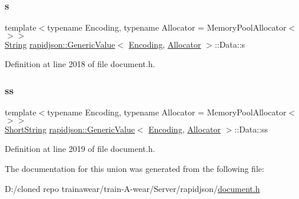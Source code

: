 \mbox{\label{unionrapidjson_1_1_generic_value_1_1_data_aeb486daed8565779613fefe9a92b5e73}} 
\subsubsection{\texorpdfstring{s}{s}}
{\footnotesize\ttfamily template$<$typename Encoding, typename Allocator = Memory\+Pool\+Allocator$<$$>$$>$ \\
\mbox{\hyperlink{structrapidjson_1_1_generic_value_1_1_string}{String}} \mbox{\hyperlink{classrapidjson_1_1_generic_value}{rapidjson\+::\+Generic\+Value}}$<$ \mbox{\hyperlink{classrapidjson_1_1_encoding}{Encoding}}, \mbox{\hyperlink{classrapidjson_1_1_allocator}{Allocator}} $>$\+::Data\+::s}



Definition at line 2018 of file document.\+h.

\mbox{\label{unionrapidjson_1_1_generic_value_1_1_data_a9d91531b96cea2f7e459ceab1d6fb55e}} 
\subsubsection{\texorpdfstring{ss}{ss}}
{\footnotesize\ttfamily template$<$typename Encoding, typename Allocator = Memory\+Pool\+Allocator$<$$>$$>$ \\
\mbox{\hyperlink{structrapidjson_1_1_generic_value_1_1_short_string}{Short\+String}} \mbox{\hyperlink{classrapidjson_1_1_generic_value}{rapidjson\+::\+Generic\+Value}}$<$ \mbox{\hyperlink{classrapidjson_1_1_encoding}{Encoding}}, \mbox{\hyperlink{classrapidjson_1_1_allocator}{Allocator}} $>$\+::Data\+::ss}



Definition at line 2019 of file document.\+h.



The documentation for this union was generated from the following file\+:\begin{DoxyCompactItemize}
\item 
D\+:/cloned repo trainawear/train-\/\+A-\/wear/\+Server/rapidjson/\mbox{\hyperlink{document_8h}{document.\+h}}\end{DoxyCompactItemize}
